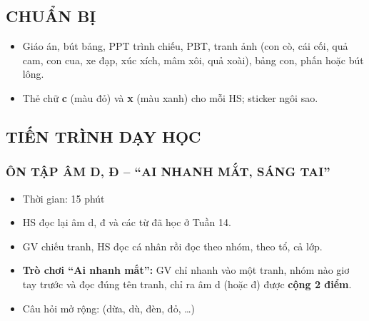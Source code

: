 \documentclass[../main.tex]{subfiles}
\begin{document}
\subsection{CHUẨN BỊ}
\begin{itemize}
    \item Giáo án, bút bảng, PPT trình chiếu, PBT, tranh ảnh (con cò, cái cối, quả cam, con cua, xe đạp, xúc xích, mâm xôi, quả xoài), bảng con, phấn hoặc bút lông.
    \item Thẻ chữ \textbf{c} (màu đỏ) và \textbf{x} (màu xanh) cho mỗi HS; sticker ngôi sao.
\end{itemize}

\subsection{TIẾN TRÌNH DẠY HỌC}

\subsubsection{ÔN TẬP ÂM D, Đ -- “AI NHANH MẮT, SÁNG TAI”}
\begin{hd}
    \begin{itemize}
        \item Thời gian: 15 phút
        \item HS đọc lại âm d, đ và các từ đã học ở Tuần 14.
    \end{itemize}
\end{hd}
\begin{itemize}
    \item GV chiếu tranh, HS đọc cá nhân rồi đọc theo nhóm, theo tổ, cả lớp.
    \item \textbf{Trò chơi “Ai nhanh mắt”:} GV chỉ nhanh vào một tranh, nhóm nào giơ tay trước và đọc đúng tên tranh, chỉ ra âm d (hoặc đ) được \textbf{cộng 2 điểm}.
    \item Câu hỏi mở rộng:  (dừa, dù, đèn, đỏ, \dots)
\end{itemize}
\GAhinh
{\centering
    \hfill
    \par}

\end{document}
